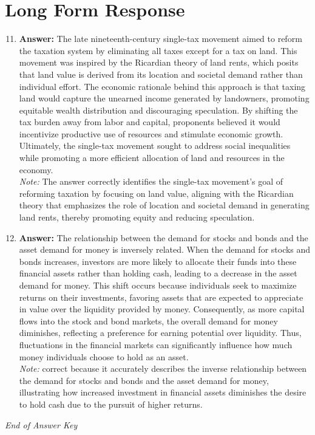 \documentclass[12pt]{article}
\begin{document}
\section*{Long Form Response}
\begin{enumerate}[label=\arabic*.]
\setcounter{enumi}{10}
\item \textbf{Answer:} The late nineteenth-century single-tax movement aimed to reform the taxation system by eliminating all taxes except for a tax on land. This movement was inspired by the Ricardian theory of land rents, which posits that land value is derived from its location and societal demand rather than individual effort. The economic rationale behind this approach is that taxing land would capture the unearned income generated by landowners, promoting equitable wealth distribution and discouraging speculation. By shifting the tax burden away from labor and capital, proponents believed it would incentivize productive use of resources and stimulate economic growth. Ultimately, the single-tax movement sought to address social inequalities while promoting a more efficient allocation of land and resources in the economy.
\\ \textit{Note:} The answer correctly identifies the single-tax movement's goal of reforming taxation by focusing on land value, aligning with the Ricardian theory that emphasizes the role of location and societal demand in generating land rents, thereby promoting equity and reducing speculation.
\item \textbf{Answer:} The relationship between the demand for stocks and bonds and the asset demand for money is inversely related. When the demand for stocks and bonds increases, investors are more likely to allocate their funds into these financial assets rather than holding cash, leading to a decrease in the asset demand for money. This shift occurs because individuals seek to maximize returns on their investments, favoring assets that are expected to appreciate in value over the liquidity provided by money. Consequently, as more capital flows into the stock and bond markets, the overall demand for money diminishes, reflecting a preference for earning potential over liquidity. Thus, fluctuations in the financial markets can significantly influence how much money individuals choose to hold as an asset.
\\ \textit{Note:} correct because it accurately describes the inverse relationship between the demand for stocks and bonds and the asset demand for money, illustrating how increased investment in financial assets diminishes the desire to hold cash due to the pursuit of higher returns.
\end{enumerate}

\vfill
\noindent\textit{End of Answer Key}
\end{document}
